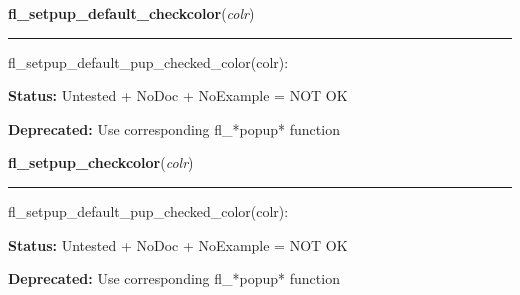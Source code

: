     \label{xformslib:deprecated:fl_setpup_default_pup_checked_color}

    \vspace{0.5ex}

\hspace{.8\funcindent}\begin{boxedminipage}{\funcwidth}

    \raggedright \textbf{fl\_setpup\_default\_checkcolor}(\textit{colr})

    \vspace{-1.5ex}

    \rule{\textwidth}{0.5\fboxrule}
\setlength{\parskip}{2ex}
    fl\_setpup\_default\_pup\_checked\_color(colr):

\setlength{\parskip}{1ex}
\textbf{Status:} Untested + NoDoc + NoExample = NOT OK



\textbf{Deprecated:} Use corresponding fl\_*popup* function



    \end{boxedminipage}

    \label{xformslib:deprecated:fl_setpup_default_pup_checked_color}

    \vspace{0.5ex}

\hspace{.8\funcindent}\begin{boxedminipage}{\funcwidth}

    \raggedright \textbf{fl\_setpup\_checkcolor}(\textit{colr})

    \vspace{-1.5ex}

    \rule{\textwidth}{0.5\fboxrule}
\setlength{\parskip}{2ex}
    fl\_setpup\_default\_pup\_checked\_color(colr):

\setlength{\parskip}{1ex}
\textbf{Status:} Untested + NoDoc + NoExample = NOT OK



\textbf{Deprecated:} Use corresponding fl\_*popup* function



    \end{boxedminipage}

